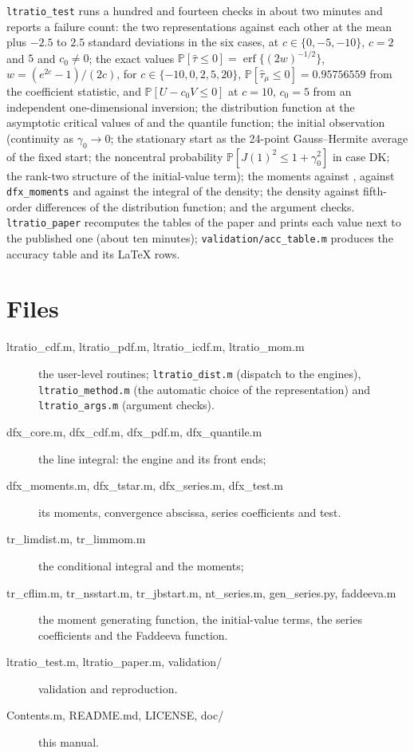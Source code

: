 \documentclass[11pt]{article}
\newcommand{\code}[1]{\texttt{#1}}
\newcommand{\PP}{{\mathbb P}}
\newcommand{\Fk}{\textsf{DK}}
\begin{document}
\code{ltratio\_test} runs a hundred and fourteen checks in about two minutes and reports a failure count: the two representations against each other at the mean plus $-2.5$ to $2.5$ standard deviations in the six cases, at $c\in\{0,-5,-10\}$, $c=2$ and $5$ and $c_0\ne0$; the exact values $\PP[\hat\tau\le0]=\operatorname{erf}\{(2w)^{-1/2}\}$, $w=(e^{2c}-1)/(2c)$, for $c\in\{-10,0,2,5,20\}$, $\PP[\hat\tau_\mu\le0]=0.95756559$ from the coefficient statistic, and $\PP[U-c_0V\le0]$ at $c=10$, $c_0=5$ from an independent one-dimensional inversion; the distribution function at the asymptotic critical values of \citet{MacKinnon2010} and the quantile function; the initial observation (continuity as $\gamma_0\to0$; the stationary start as the 24-point Gauss--Hermite average of the fixed start; the noncentral probability $\PP[J(1)^2\le1+\gamma_0^2]$ in case \Fk; the rank-two structure of the initial-value term); the moments against \citet{Nabeya1999}, against \code{dfx\_moments} and against the integral of the density; the density against fifth-order differences of the distribution function; and the argument checks.  \code{ltratio\_paper} recomputes the tables of the paper and prints each value next to the published one (about ten minutes); \code{validation/acc\_table.m} produces the accuracy table and its LaTeX rows.

\section{Files}
\label{sec:files}

\begin{description}
\item[ltratio\_cdf.m, ltratio\_pdf.m, ltratio\_icdf.m, ltratio\_mom.m] the user-level routines; \code{ltratio\_dist.m} (dispatch to the engines), \code{ltratio\_method.m} (the automatic choice of the representation) and \code{ltratio\_args.m} (argument checks).
\item[dfx\_core.m, dfx\_cdf.m, dfx\_pdf.m, dfx\_quantile.m] the line integral: the engine and its front ends;
\item[dfx\_moments.m, dfx\_tstar.m, dfx\_series.m, dfx\_test.m] its moments, convergence abscissa, series coefficients and test.
\item[tr\_limdist.m, tr\_limmom.m] the conditional integral and the moments;
\item[tr\_cflim.m, tr\_nsstart.m, tr\_jbstart.m, nt\_series.m, gen\_series.py, faddeeva.m] the moment generating function, the initial-value terms, the series coefficients and the Faddeeva function.
\item[ltratio\_test.m, ltratio\_paper.m, validation/] validation and reproduction.
\item[Contents.m, README.md, LICENSE, doc/] this manual.
\end{description}
\end{document}
